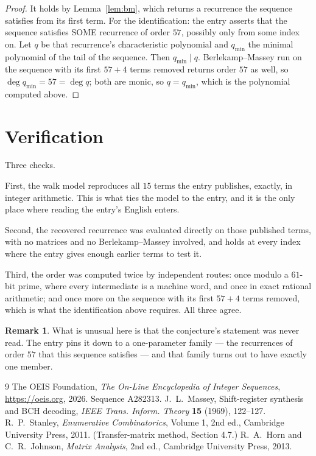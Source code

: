 \documentclass[11pt,a4paper]{article}
\theoremstyle{plain}
\theoremstyle{definition}
\newtheorem{remark}[theorem]{Remark}
\begin{document}
\begin{proof}
It holds by Lemma~\ref{lem:bm}, which returns a recurrence the sequence satisfies from its
first term. For the identification: the entry asserts that the sequence satisfies SOME
recurrence of order $57$, possibly only from some index on. Let $q$ be that recurrence's
characteristic polynomial and $q_{\min}$ the minimal polynomial of the tail of the sequence.
Then $q_{\min}\mid q$. Berlekamp--Massey run on the sequence with its first $57+4$ terms
removed returns order $57$ as well, so $\deg q_{\min}=57=\deg q$; both are monic, so
$q=q_{\min}$, which is the polynomial computed above.
\end{proof}

\section{Verification}

Three checks.

First, the walk model reproduces all $15$ terms the entry publishes, exactly, in integer
arithmetic. This is what ties the model to the entry, and it is the only place where reading
the entry's English enters.

Second, the recovered recurrence was evaluated directly on those published terms, with no
matrices and no Berlekamp--Massey involved, and holds at every index where the entry gives
enough earlier terms to test it.

Third, the order was computed twice by independent routes: once modulo a $61$-bit prime, where
every intermediate is a machine word, and once in exact rational arithmetic; and once more on
the sequence with its first $57+4$ terms removed, which is what the identification above
requires. All three agree.

\begin{remark}
What is unusual here is that the conjecture's statement was never read. The entry pins it down
to a one-parameter family --- the recurrences of order $57$ that this sequence satisfies
--- and that family turns out to have exactly one member.
\end{remark}

\begin{thebibliography}{9}
 The OEIS Foundation, \emph{The On-Line Encyclopedia of Integer
Sequences}, \url{https://oeis.org}, 2026. Sequence A282313.
 J.~L.~Massey, Shift-register synthesis and BCH decoding, \emph{IEEE
Trans. Inform. Theory} \textbf{15} (1969), 122--127.
 R.~P.~Stanley, \emph{Enumerative Combinatorics}, Volume 1, 2nd ed.,
Cambridge University Press, 2011. (Transfer-matrix method, Section 4.7.)
 R.~A.~Horn and C.~R.~Johnson, \emph{Matrix Analysis}, 2nd ed., Cambridge
University Press, 2013.
\end{thebibliography}
\end{document}
